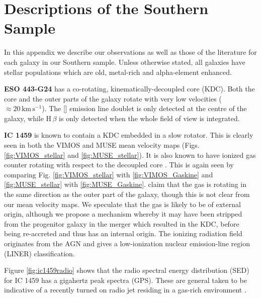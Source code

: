 \chapter{Descriptions of the Southern Sample}
	\label{cha:Description}
In this appendix we describe our observations as well as those of the literature for each galaxy in our Southern sample. Unless otherwise stated, all galaxies have stellar populations which are old, metal-rich and alpha-element enhanced.

\textbf{ESO 443-G24} has a co-rotating, kinematically-decoupled core (KDC). Both the core and the outer parts of the galaxy rotate with very low velocities ($\approx 20\,\mathrm{km\,s^{-1}}$). The [] emission line doublet is only detected at the centre of the galaxy, while H\,$\beta$ is only detected when the whole field of view is integrated. 

\textbf{IC 1459} is known to contain a KDC \citep{Franx1988} embedded in a slow rotator. This is clearly seen in both the VIMOS and MUSE mean velocity maps (Figs. \ref{fig:VIMOS_stellar} and \ref{fig:MUSE_stellar}). It is also known to have ionized gas counter rotating with respect to the decoupled core \citep{VerdoesKleijn2000}. This is again seen by comparing Fig. \ref{fig:VIMOS_stellar} with \ref{fig:VIMOS_Gaskine} and \ref{fig:MUSE_stellar} with \ref{fig:MUSE_Gaskine}. \citet{Franx1988} claim that the gas is rotating in the same direction as the outer part of the galaxy, though this is not clear from our mean velocity maps. We speculate that the gas is likely to be of external origin, although we propose a mechanism whereby it may have been stripped from the progenitor galaxy in the merger which resulted in the KDC, before being re-accreted and thus has an internal origin. The ionizing radiation field originates from the AGN and gives a low-ionization nuclear emission-line region (LINER) classification.

Figure \ref{fig:ic1459radio} shows that the radio spectral energy distribution (SED) for IC 1459 has a gigahertz peak spectra (GPS). These are general taken to be indicative of a recently turned on radio jet residing in a gas-rich environment \citep[e.g.][]{ODea1998}. 

